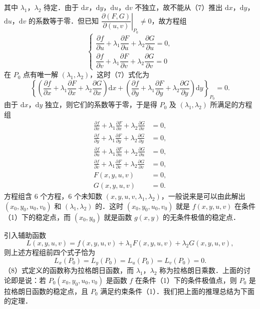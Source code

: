 其中 $\lambda_{1}$，$\lambda_{2}$ 待定．由于 $\mathrm{d}x$，$\mathrm{d}y$，$\mathrm{d}u$，$\mathrm{d}v$ 不独立，故不能从（7）推出 $\mathrm{d}x$，$\mathrm{d}y$，$\mathrm{d}u$，$\mathrm{d}v$ 的系数等于零．但已知 $\left.\dfrac{\partial(F,G)}{\partial(u,v)}\right|_{P_{0}}\neq0$，故方程组
\[
\begin{cases}
\dfrac{\partial f}{\partial u}+\lambda_{1}\dfrac{\partial F}{\partial u}+\lambda_{2}\dfrac{\partial G}{\partial u}=0,\\[2mm]
\dfrac{\partial f}{\partial v}+\lambda_{1}\dfrac{\partial F}{\partial v}+\lambda_{2}\dfrac{\partial G}{\partial v}=0
\end{cases}
\]
在 $P_{0}$ 点有唯一解 $(\lambda_{1},\lambda_{2})$，这时（7）式化为
\[
\left\{\left(\frac{\partial f}{\partial x}+\lambda_{1}\frac{\partial F}{\partial x}+\lambda_{2}\frac{\partial G}{\partial x}\right)\mathrm{d}x+\left(\frac{\partial f}{\partial y}+\lambda_{1}\frac{\partial F}{\partial y}+\lambda_{2}\frac{\partial G}{\partial y}\right)\mathrm{d}y\right\}_{P_{0}}=0.
\]
由于 $\mathrm{d}x$，$\mathrm{d}y$ 独立，则它们的系数等于零，于是得 $P_{0}$ 及 $(\lambda_{1},\lambda_{2})$ 所满足的方程组
\[
\begin{aligned}
\frac{\partial f}{\partial x}+\lambda_{1}\frac{\partial F}{\partial x}+\lambda_{2}\frac{\partial G}{\partial x}&=0,\\
\frac{\partial f}{\partial y}+\lambda_{1}\frac{\partial F}{\partial y}+\lambda_{2}\frac{\partial G}{\partial y}&=0,\\
\frac{\partial f}{\partial u}+\lambda_{1}\frac{\partial F}{\partial u}+\lambda_{2}\frac{\partial G}{\partial u}&=0,\\
\frac{\partial f}{\partial v}+\lambda_{1}\frac{\partial F}{\partial v}+\lambda_{2}\frac{\partial G}{\partial v}&=0,\\
F(x,y,u,v)&=0,\\
G(x,y,u,v)&=0.
\end{aligned}
\]
方程组含 $6$ 个方程，$6$ 个未知数 $(x,y,u,v,\lambda_{1},\lambda_{2})$，一般说来是可以由此解出 $(x_{0},y_{0},u_{0},v_{0})$ 和 $(\lambda_{1},\lambda_{2})$ 的．这时 $(x_{0},y_{0},u_{0},v_{0})$ 就是 $f(x,y,u,v)$ 在条件（1）下的稳定点，而 $(x_{0},y_{0})$ 就是函数 $g(x,y)$ 的无条件极值的稳定点．

引入辅助函数
\begin{equation}
L(x,y,u,v)=f(x,y,u,v)+\lambda_{1}F(x,y,u,v)+\lambda_{2}G(x,y,u,v),
\tag{8}
\end{equation}
则上述方程组前四个式子恰为
\[
L_{x}(P_{0})=L_{y}(P_{0})=L_{u}(P_{0})=L_{v}(P_{0})=0.
\]
（8）式定义的函数称为拉格朗日函数，而 $\lambda_{1}$，$\lambda_{2}$ 称为拉格朗日乘数．上面的讨论即是说：若 $P_{0}(x_{0},y_{0},u_{0},v_{0})$ 是函数 $f$ 在条件（1）下的条件极值点，则 $P_{0}$ 是拉格朗日函数的稳定点，且 $P_{0}$ 满足约束条件（1）．我们把上面的推理总结为下面的定理．

